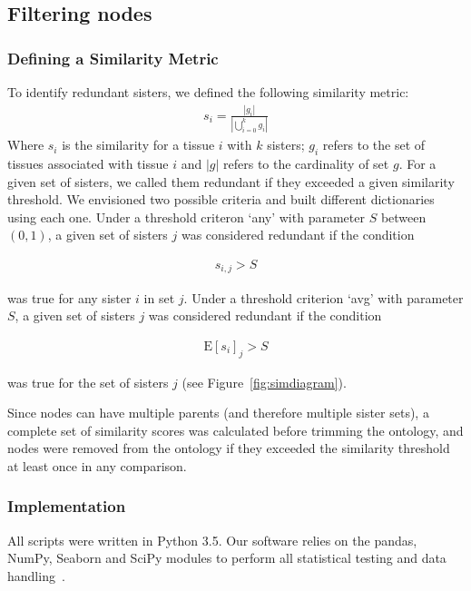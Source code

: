 \subsection*{Filtering nodes}
\subsubsection*{Defining a Similarity Metric}
To identify redundant sisters, we defined the following similarity metric:
\begin{eqnarray}\label{similarity def}
	s_i = \frac{|g_i|}{|\bigcup_{i= 0}^k g_i|}
\end{eqnarray}
Where $s_i$ is the similarity for a tissue $i$ with $k$ sisters; $g_i$ refers to
the set of tissues associated with tissue $i$ and $|g|$ refers to the
cardinality of set $g$. For a given set of sisters, we called them redundant if
they exceeded a given similarity threshold. We envisioned two possible criteria
and built different dictionaries using each one. Under a threshold criteron
`any' with parameter $S$ between $(0, 1)$, a given set of sisters $j$ was
considered redundant if the condition

\begin{eqnarray}\label{any threshold}
	s_{i, j} > S
\end{eqnarray}

was true for any sister $i$ in set $j$. Under a threshold criterion `avg' with
parameter $S$, a given set of sisters $j$ was considered redundant if the
condition

\begin{eqnarray}\label{avg threshold}
	\mathrm{E}[s_i]_j > S
\end{eqnarray}

was true for the set of sisters $j$ (see Figure~\ref{fig:simdiagram}).

Since nodes can have multiple parents (and therefore multiple sister sets), a
complete set of similarity scores was calculated before trimming the ontology,
and nodes were removed from the ontology if they exceeded the similarity
threshold at least once in any comparison.

\subsubsection*{Implementation}
All scripts were written in Python 3.5. Our software relies on the pandas, NumPy,
Seaborn and SciPy modules to perform all statistical testing and data
handling~\cite{McKinney2011, VanDerWalt2011, Oliphant2007}.


